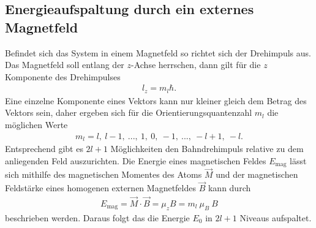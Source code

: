 \subsection{Energieaufspaltung durch ein externes Magnetfeld}
Befindet sich das System in einem Magnetfeld so richtet sich der Drehimpuls aus.
Das Magnetfeld soll entlang der $z$-Achse herrschen, dann gilt für die $z$ Komponente des Drehimpulses
\begin{align}
	l_z=m_l\hbar.
\end{align}
Eine einzelne Komponente eines Vektors kann nur kleiner gleich dem Betrag des Vektors sein, daher ergeben sich für die Orientierungsquantenzahl
$m_l$ die möglichen Werte 
\begin{align}
	m_l = l,\ l-1,\ ...,\ 1,\ 0,\ -1,\ ... ,\ -l+1,\ -l.
\end{align}
Entsprechend gibt es $2l+1$ Möglichkeiten den Bahndrehimpuls relative zu dem anliegenden Feld auszurichten.
Die Energie eines magnetischen Feldes $E_\text{mag}$ lässt sich mithilfe des magnetischen Momentes des Atoms $\vec{M}$ und der magnetischen Feldstärke eines homogenen externen Magnetfeldes $\vec{B}$ kann durch 
\begin{align}
	E_\text{mag}=\vec{M}\cdot\vec{B}=\mu_zB=m_l\ \mu_B\ B\label{eq:Emag}
\end{align}
beschrieben werden. 
Daraus folgt das die Energie $E_0$ in $2l+1$ Niveaus aufspaltet.
